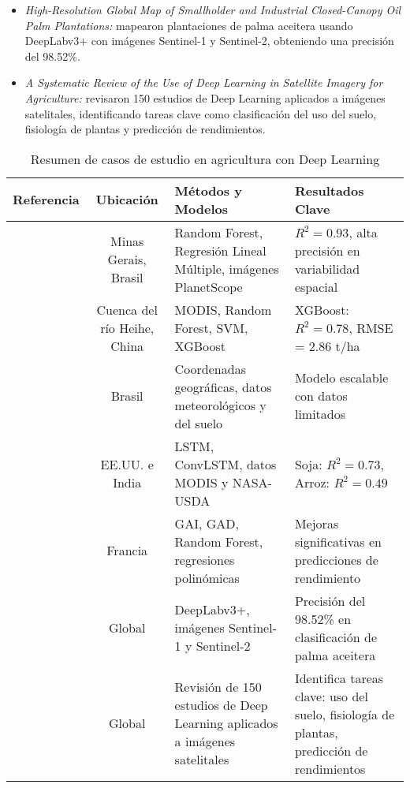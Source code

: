 \begin{itemize}
    \item \textit{High-Resolution Global Map of Smallholder and Industrial Closed-Canopy Oil Palm Plantations:} \cite{descals2021} mapearon plantaciones de palma aceitera usando DeepLabv3+ con imágenes Sentinel-1 y Sentinel-2, obteniendo una precisión del 98.52\%.

    \item \textit{A Systematic Review of the Use of Deep Learning in Satellite Imagery for Agriculture:} \cite{victor2022} revisaron 150 estudios de Deep Learning aplicados a imágenes satelitales, identificando tareas clave como clasificación del uso del suelo, fisiología de plantas y predicción de rendimientos.

\end{itemize}


\begin{table*}[t]
        \centering
        \caption{Resumen de casos de estudio en agricultura con Deep Learning}\label{tab:case_studies}
        \begin{tabular}{c c p{4.5cm} p{5.25cm}}
            \toprule
            \textbf{Referencia} & \textbf{Ubicación} & \textbf{Métodos y Modelos} & \textbf{Resultados Clave} \\ 
            \midrule
            \cite{martello2022} & Minas Gerais, Brasil & Random Forest, Regresión Lineal Múltiple, imágenes PlanetScope & $R^2 = 0.93$, alta precisión en variabilidad espacial \\ 
            \cite{geng2021} & Cuenca del río Heihe, China & MODIS, Random Forest, SVM, XGBoost & XGBoost: $R^2 = 0.78$, RMSE = 2.86 t/ha \\ 
            \cite{cunha2020} & Brasil & Coordenadas geográficas, datos meteorológicos y del suelo & Modelo escalable con datos limitados \\ 
            \cite{divakar2022} & EE.UU. e India & LSTM, ConvLSTM, datos MODIS y NASA-USDA & Soja: $R^2 = 0.73$, Arroz: $R^2 = 0.49$ \\ 
            \cite{debaeke2023} & Francia & GAI, GAD, Random Forest, regresiones polinómicas & Mejoras significativas en predicciones de rendimiento \\ 
            \cite{descals2021} & Global & DeepLabv3+, imágenes Sentinel-1 y Sentinel-2 & Precisión del 98.52\% en clasificación de palma aceitera \\ 
            \cite{victor2022} & Global & Revisión de 150 estudios de Deep Learning aplicados a imágenes satelitales & Identifica tareas clave: uso del suelo, fisiología de plantas, predicción de rendimientos \\ 
            \bottomrule
        \end{tabular}
\end{table*}


